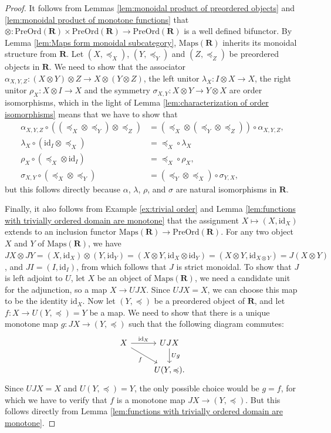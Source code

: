 \documentclass[12pt]{tac}
\theoremstyle{definition}
\theoremstyle{remark}
\newcommand{\qo}{{\boldsymbol{\preccurlyeq}}}
\newcommand{\<}{\langle}
\renewcommand{\>}{\rangle}
\renewcommand{\:}{\colon}
\newcommand{\id}{\mathrm{id}}
\begin{document}
\begin{proof}
It follows from Lemmas \ref{lem:monoidal product of preordered objects} and \ref{lem:monoidal product of monotone functions} that $\otimes:\mathrm{PreOrd}(\mathbf R)\times\mathrm{PreOrd}(\mathbf R)\to\mathrm{PreOrd}(\mathbf R)$ is a well defined bifunctor.
By Lemma \ref{lem:Maps form monoidal subcategory}, $\mathrm{Maps}(\mathbf R)$ inherits its monoidal structure from $\mathbf R$. Let $(X,\qo_X)$, $(Y,\qo_Y)$ and $(Z,\qo_Z)$ be preordered objects in $\mathbf R$. We need to show that the associator $\alpha_{X,Y,Z}:(X\otimes Y)\otimes Z\to X\otimes (Y\otimes Z)$, the left unitor $\lambda_X:I\otimes X\to X$, the right unitor $\rho_X:X\otimes I\to X$ and the symmetry $\sigma_{X,Y}:X\otimes Y\to Y\otimes X$ are order isomorphisms, which in the light of Lemma \ref{lem:characterization of order isomorphisms} means that we have to show that
\begin{align*}
\alpha_{X,Y,Z}\circ((\qo_X\otimes\qo_Y)\otimes\qo_Z) & =(\qo_X\otimes(\qo_Y\otimes\qo_Z))\circ \alpha_{X,Y,Z},\\
\lambda_{X}\circ (\id_I\otimes\qo_X) & = \qo_X\circ\lambda_X\\
\rho_X\circ (\qo_X\otimes\id_I) & =\qo_X\circ\rho_X,\\
\sigma_{X,Y}\circ(\qo_X\otimes\qo_Y) & = (\qo_Y\otimes\qo_X)\circ\sigma_{Y,X},
\end{align*}
but this follows directly because $\alpha$, $\lambda$, $\rho$, and $\sigma$ are natural isomorphisms in $\mathbf R$.


 Finally, it also follows from Example \ref{ex:trivial order} and Lemma \ref{lem:functions with trivially ordered domain are monotone} that the assignment $X\mapsto(X,\id_X)$ extends to an inclusion functor $\mathrm{Maps}(\mathbf R)\to\mathrm{PreOrd}(\mathbf R)$. For any two object $X$ and $Y$ of $\mathrm{Maps}(\mathbf R)$, we have $JX\otimes JY=(X,\id_X)\otimes(Y,\id_Y)=(X\otimes Y,\id_X\otimes\id_Y)=(X\otimes Y,\id_{X\otimes Y})=J(X\otimes Y)$, and $JI=(I,\id_I)$, from which follows that $J$ is strict monoidal. To show that $J$ is left adjoint to $U$, let $X$ be an object of $\mathrm{Maps}(\mathbf R)$, we need a candidate unit for the adjunction, so a map $X\to UJX$. Since $UJX=X$, we can choose this map to be the identity $\id_X$. Now let $(Y,\qo)$ be a preordered object of $\mathbf R$, and let $f:X\to U(Y,\qo)=Y$ be a map. We need to show that there is a unique monotone map $g:JX\to (Y,\qo)$ such that the following diagram commutes:
 \[ \begin{tikzcd}
 X\ar{r}{\id_X}\ar{dr}[swap]{f} & UJX\ar{d}{Ug}  \\
& U(Y,\qo). 
\end{tikzcd} \]
Since $UJX=X$ and $U(Y,\qo)=Y$, the only possible choice would be $g=f$, for which we have to verify that $f$ is a monotone map $JX\to (Y,\qo)$. But this follows directly from Lemma \ref{lem:functions with trivially ordered domain are monotone}.
\end{proof}
\end{document}
